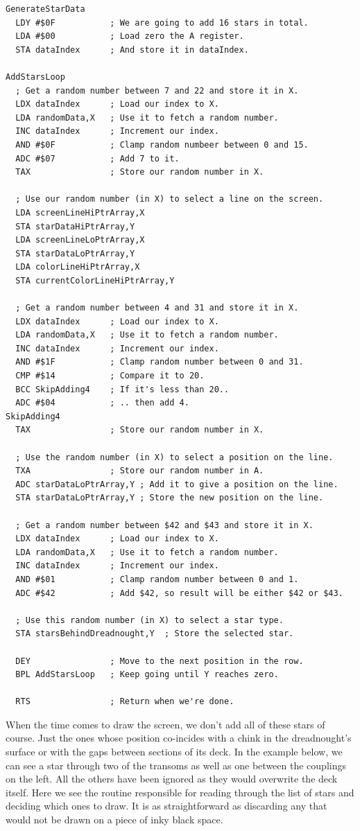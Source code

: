 \clearpage
\begin{lstlisting}
GenerateStarData
  LDY #$0F           ; We are going to add 16 stars in total.
  LDA #$00           ; Load zero the A register.
  STA dataIndex      ; And store it in dataIndex.

AddStarsLoop
  ; Get a random number between 7 and 22 and store it in X.
  LDX dataIndex      ; Load our index to X.
  LDA randomData,X   ; Use it to fetch a random number.
  INC dataIndex      ; Increment our index.
  AND #$0F           ; Clamp random numbeer between 0 and 15.
  ADC #$07           ; Add 7 to it.
  TAX                ; Store our random number in X.

  ; Use our random number (in X) to select a line on the screen.
  LDA screenLineHiPtrArray,X
  STA starDataHiPtrArray,Y
  LDA screenLineLoPtrArray,X
  STA starDataLoPtrArray,Y
  LDA colorLineHiPtrArray,X
  STA currentColorLineHiPtrArray,Y

  ; Get a random number between 4 and 31 and store it in X.
  LDX dataIndex      ; Load our index to X.
  LDA randomData,X   ; Use it to fetch a random number.
  INC dataIndex      ; Increment our index.
  AND #$1F           ; Clamp random number between 0 and 31.
  CMP #$14           ; Compare it to 20.
  BCC SkipAdding4    ; If it's less than 20..
  ADC #$04           ; .. then add 4.
SkipAdding4                
  TAX                ; Store our random number in X.

  ; Use the random number (in X) to select a position on the line.
  TXA                ; Store our random number in A.
  ADC starDataLoPtrArray,Y ; Add it to give a position on the line.
  STA starDataLoPtrArray,Y ; Store the new position on the line.

  ; Get a random number between $42 and $43 and store it in X.
  LDX dataIndex      ; Load our index to X.
  LDA randomData,X   ; Use it to fetch a random number.
  INC dataIndex      ; Increment our index.
  AND #$01           ; Clamp random number between 0 and 1.
  ADC #$42           ; Add $42, so result will be either $42 or $43.

  ; Use this random number (in X) to select a star type.
  STA starsBehindDreadnought,Y  ; Store the selected star.

  DEY                ; Move to the next position in the row.
  BPL AddStarsLoop   ; Keep going until Y reaches zero.

  RTS                ; Return when we're done.
\end{lstlisting}
\clearpage
When the time comes to draw the screen, we don't add all of these stars of course.
Just the ones whose position co-incides with a chink in the dreadnought's surface or 
with the gaps between sections of its deck. In the example below, we can see a star
through two of the transoms as well as one between the couplings on the left. All the
others have been ignored as they would overwrite the deck itself.
Here we see the routine responsible for reading through the list of stars and deciding
which ones to draw. It is as straightforward as discarding any that would not be drawn
on a piece of inky black space.

